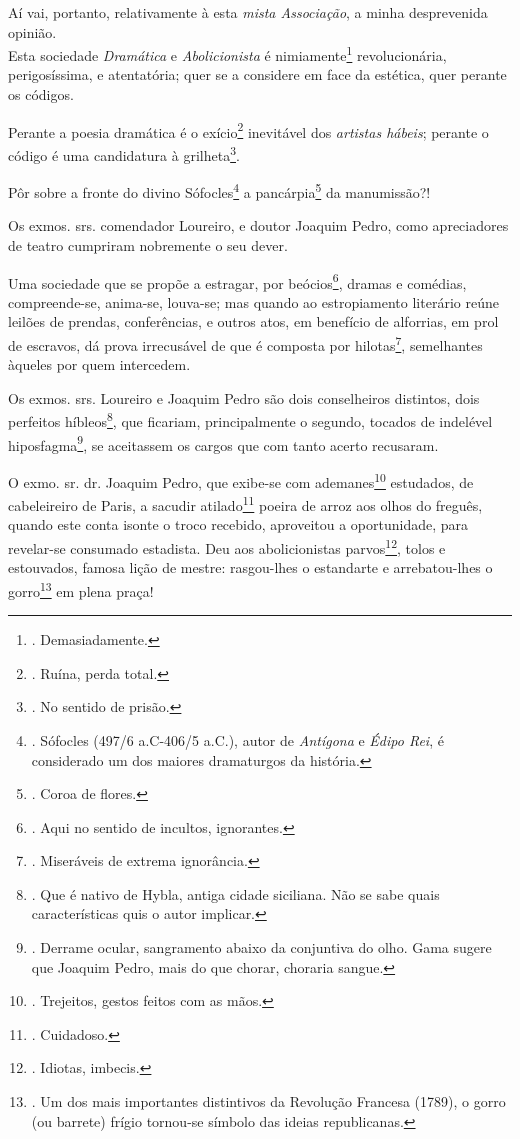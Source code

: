 Aí vai, portanto, relativamente à esta \emph{mista Associação}, a minha
desprevenida opinião.\\
Esta sociedade \emph{Dramática} e \emph{Abolicionista} é
nimiamente\footnote{. Demasiadamente.} revolucionária, perigosíssima, e
atentatória; quer se a considere em face da estética, quer perante os
códigos.

Perante a poesia dramática é o exício\footnote{. Ruína, perda total.}
inevitável dos \emph{artistas hábeis}; perante o código é uma
candidatura à grilheta\footnote{. No sentido de prisão.}.

Pôr sobre a fronte do divino Sófocles\footnote{. Sófocles (497/6
  a.C-406/5 a.C.), autor de \emph{Antígona} e \emph{Édipo Rei}, é
  considerado um dos maiores dramaturgos da história.} a
pancárpia\footnote{. Coroa de flores.} da manumissão?!

Os exmos. srs. comendador Loureiro, e doutor Joaquim Pedro, como
apreciadores de teatro cumpriram nobremente o seu dever.

Uma sociedade que se propõe a estragar, por beócios\footnote{. Aqui no
  sentido de incultos, ignorantes.}, dramas e comédias, compreende-se,
anima-se, louva-se; mas quando ao estropiamento literário reúne leilões
de prendas, conferências, e outros atos, em benefício de alforrias, em
prol de escravos, dá prova irrecusável de que é composta por
hilotas\footnote{. Miseráveis de extrema ignorância.}, semelhantes
àqueles por quem intercedem.

Os exmos. srs. Loureiro e Joaquim Pedro são dois conselheiros distintos,
dois perfeitos híbleos\footnote{. Que é nativo de Hybla, antiga cidade
  siciliana. Não se sabe quais características quis o autor implicar.},
que ficariam, principalmente o segundo, tocados de indelével
hiposfagma\footnote{. Derrame ocular, sangramento abaixo da conjuntiva
  do olho. Gama sugere que Joaquim Pedro, mais do que chorar, choraria
  sangue.}, se aceitassem os cargos que com tanto acerto recusaram.

O exmo. sr. dr. Joaquim Pedro, que exibe-se com ademanes\footnote{.
  Trejeitos, gestos feitos com as mãos.} estudados, de cabeleireiro de
Paris, a sacudir atilado\footnote{. Cuidadoso.} poeira de arroz aos
olhos do freguês, quando este conta isonte o troco recebido, aproveitou
a oportunidade, para revelar-se consumado estadista. Deu aos
abolicionistas parvos\footnote{. Idiotas, imbecis.}, tolos e estouvados,
famosa lição de mestre: rasgou-lhes o estandarte e arrebatou-lhes o
gorro\footnote{. Um dos mais importantes distintivos da Revolução
  Francesa (1789), o gorro (ou barrete) frígio tornou-se símbolo das
  ideias republicanas.} em plena praça!

